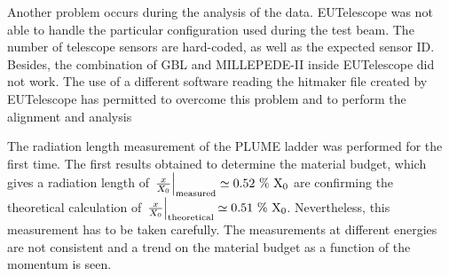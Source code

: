   Another problem occurs during the analysis of the data. 
  EUTelescope was not able to handle the particular configuration used during the test beam.
  The number of telescope sensors are hard-coded, as well as the expected sensor ID.
  Besides, the combination of \gls{GBL} and MILLEPEDE-II inside EUTelescope did not work.
  The use of a different software reading the hitmaker file created by EUTelescope has permitted to overcome this problem and to perform the alignment and analysis 

  The radiation length measurement of the \gls{PLUME} ladder was performed for the first time.
  The first results obtained to determine the material budget, which gives a radiation length of $\left. \frac{x}{X_0} \right|_{\rm{measured}} \simeq 0.52~\%~\rm{X_0}$ are confirming the theoretical calculation of $\left. \frac{x}{X_0}\right|_{\rm{theoretical}} \simeq 0.51~\%~\rm{X_0}$.
  Nevertheless, this measurement has to be taken carefully. 
  The measurements at different energies are not consistent and a trend on the material budget as a function of the momentum is seen.
